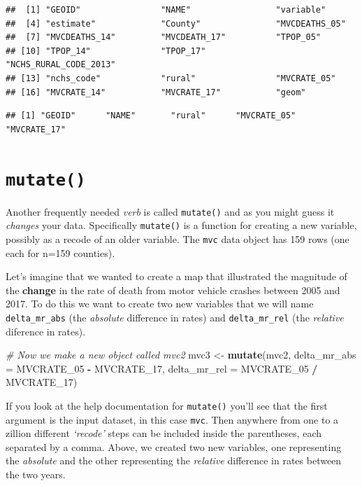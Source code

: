 \documentclass[
]{book}
\newenvironment{Shaded}{\begin{snugshade}}{\end{snugshade}}
\newcommand{\AttributeTok}[1]{\textcolor[rgb]{0.13,0.29,0.53}{#1}}
\newcommand{\CommentTok}[1]{\textcolor[rgb]{0.56,0.35,0.01}{\textit{#1}}}
\newcommand{\FunctionTok}[1]{\textcolor[rgb]{0.13,0.29,0.53}{\textbf{#1}}}
\newcommand{\NormalTok}[1]{#1}
\newcommand{\OtherTok}[1]{\textcolor[rgb]{0.56,0.35,0.01}{#1}}
\newcommand{\SpecialCharTok}[1]{\textcolor[rgb]{0.81,0.36,0.00}{\textbf{#1}}}
\begin{document}
\begin{verbatim}
##  [1] "GEOID"                "NAME"                 "variable"            
##  [4] "estimate"             "County"               "MVCDEATHS_05"        
##  [7] "MVCDEATHS_14"         "MVCDEATH_17"          "TPOP_05"             
## [10] "TPOP_14"              "TPOP_17"              "NCHS_RURAL_CODE_2013"
## [13] "nchs_code"            "rural"                "MVCRATE_05"          
## [16] "MVCRATE_14"           "MVCRATE_17"           "geom"
\end{verbatim}

\begin{verbatim}
## [1] "GEOID"      "NAME"       "rural"      "MVCRATE_05" "MVCRATE_17"
\end{verbatim}

\hypertarget{mutate}{%
\section{\texorpdfstring{\texttt{mutate()}}{mutate()}}\label{mutate}}

Another frequently needed \emph{verb} is called \texttt{mutate()} and as you might guess it \emph{changes} your data. Specifically \texttt{mutate()} is a function for creating a new variable, possibly as a recode of an older variable. The \texttt{mvc} data object has 159 rows (one each for n=159 counties).

Let's imagine that we wanted to create a map that illustrated the magnitude of the \textbf{change} in the rate of death from motor vehicle crashes between 2005 and 2017. To do this we want to create two new variables that we will name \texttt{delta\_mr\_abs} (the \emph{absolute} difference in rates) and \texttt{delta\_mr\_rel} (the \emph{relative} diference in rates).

\begin{Shaded}
\begin{Highlighting}[]
\CommentTok{\# Now we make a new object called mvc2}
\NormalTok{mvc3 }\OtherTok{\textless{}{-}} \FunctionTok{mutate}\NormalTok{(mvc2, }
               \AttributeTok{delta\_mr\_abs =}\NormalTok{ MVCRATE\_05 }\SpecialCharTok{{-}}\NormalTok{ MVCRATE\_17,}
               \AttributeTok{delta\_mr\_rel =}\NormalTok{ MVCRATE\_05 }\SpecialCharTok{/}\NormalTok{ MVCRATE\_17)}
\end{Highlighting}
\end{Shaded}

If you look at the help documentation for \texttt{mutate()} you'll see that the first argument is the input dataset, in this case \texttt{mvc}. Then anywhere from one to a zillion different \emph{`recode'} steps can be included inside the parentheses, each separated by a comma. Above, we created two new variables, one representing the \emph{absolute} and the other representing the \emph{relative} difference in rates between the two years.
\end{document}
